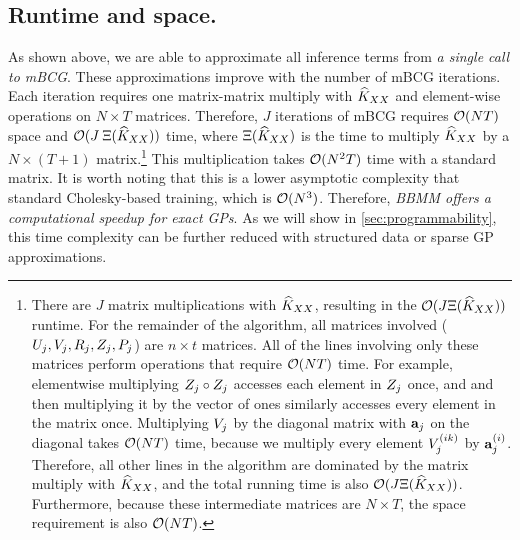 \subsection{Runtime and space.}
As shown above, we are able to approximate all inference terms from \emph{a single call to mBCG}.
These approximations improve with the number of mBCG iterations.
Each iteration requires one matrix-matrix multiply with $\widehat{K}_{XX}$ and element-wise operations on $N \times T$ matrices.
Therefore, $J$ iterations of mBCG requires $\bigo{NT}$ space and $\bigo{J \: \mmm{\trainK}}$ time,
where $\Xi (\widehat{K}_{XX})$ is the time to multiply $\widehat{K}_{XX}$ by a $N \times (T + 1)$ matrix.\footnote{
	There are $J$ matrix multiplications with $\widehat{K}_{XX}$, resulting in the $\bigo{J \mmm{\trainK}}$ runtime.
	For the remainder of the algorithm, all matrices involved ($U_{j},V_j,R_j,Z_j,P_j$) are $n \times t$ matrices.
	All of the lines involving only these matrices perform operations that require $\bigo{NT}$ time.
	For example, elementwise multiplying $Z_{j} \circ Z_{j}$ accesses each element in $Z_{j}$ once, and and then multiplying it by the vector of ones similarly accesses every element in the matrix once.
	Multiplying $V_{j}$ by the diagonal matrix with $\mathbf{a}_{j}$ on the diagonal takes $\bigo{NT}$ time, because we multiply every element $V_{j}^{(ik)}$ by $\mathbf{a}_{j}^{(i)}$.
	Therefore, all other lines in the algorithm are dominated by the matrix multiply with $\widehat{K}_{XX}$, and the total running time is also $\bigo{J \mmm{\trainK}}$.
	Furthermore, because these intermediate matrices are $N \times T$, the space requirement is also $\bigo{NT}$.
}
This multiplication takes $\bigo{N^2 T}$ time with a standard matrix.
It is worth noting that this is a lower asymptotic complexity that standard Cholesky-based training, which is $\bigo{N^3}$.
Therefore, \emph{BBMM offers a computational speedup for exact GPs}.
As we will show in \cref{sec:programmability}, this time complexity can be further reduced with structured data or sparse GP approximations.


